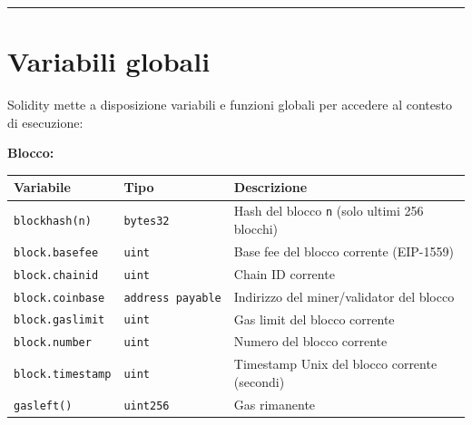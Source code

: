 \documentclass[
  italian,
  openany]{book}
\newcounter{none} %
\begin{document}
\begin{center}\rule{0.5\linewidth}{0.5pt}\end{center}

\section{Variabili globali}\label{variabili-globali}

Solidity mette a disposizione variabili e funzioni globali per accedere
al contesto di esecuzione:

\textbf{Blocco:}

{\def\LTcaptype{none} %
\begin{longtable}[]{@{}
  >{\raggedright\arraybackslash}p{}
  >{\raggedright\arraybackslash}p{}
  >{\raggedright\arraybackslash}p{}@{}}
\toprule\noalign{}
\begin{minipage}[b]{\linewidth}\raggedright
Variabile
\end{minipage} & \begin{minipage}[b]{\linewidth}\raggedright
Tipo
\end{minipage} & \begin{minipage}[b]{\linewidth}\raggedright
Descrizione
\end{minipage} \\
\midrule\noalign{}
\endhead
\bottomrule\noalign{}
\endlastfoot
\texttt{blockhash(n)} & \texttt{bytes32} & Hash del blocco \texttt{n}
(solo ultimi 256 blocchi) \\
\texttt{block.basefee} & \texttt{uint} & Base fee del blocco corrente
(EIP-1559) \\
\texttt{block.chainid} & \texttt{uint} & Chain ID corrente \\
\texttt{block.coinbase} & \texttt{address\ payable} & Indirizzo del
miner/validator del blocco \\
\texttt{block.gaslimit} & \texttt{uint} & Gas limit del blocco
corrente \\
\texttt{block.number} & \texttt{uint} & Numero del blocco corrente \\
\texttt{block.timestamp} & \texttt{uint} & Timestamp Unix del blocco
corrente (secondi) \\
\texttt{gasleft()} & \texttt{uint256} & Gas rimanente \\
\end{longtable}
}
\end{document}
